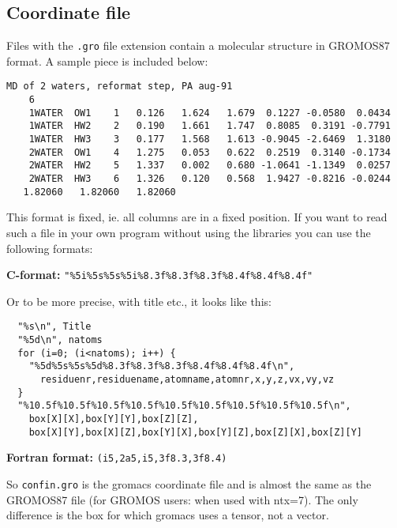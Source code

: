 \subsection{Coordinate file}
\label{subsec:grofile}
Files with the {\tt .gro} file extension contain a molecular structure in 
GROMOS87 format. A sample piece is included below:
{\small\begin{verbatim}
MD of 2 waters, reformat step, PA aug-91
    6
    1WATER  OW1    1   0.126   1.624   1.679  0.1227 -0.0580  0.0434
    1WATER  HW2    2   0.190   1.661   1.747  0.8085  0.3191 -0.7791
    1WATER  HW3    3   0.177   1.568   1.613 -0.9045 -2.6469  1.3180
    2WATER  OW1    4   1.275   0.053   0.622  0.2519  0.3140 -0.1734
    2WATER  HW2    5   1.337   0.002   0.680 -1.0641 -1.1349  0.0257
    2WATER  HW3    6   1.326   0.120   0.568  1.9427 -0.8216 -0.0244
   1.82060   1.82060   1.82060
\end{verbatim}}
This format is fixed, ie. all columns are in a fixed position. If you
want to read such a file in your own program without using the
{\gromacs} libraries you can use the following formats:

{\bf C-format:} \verb'"%5i%5s%5s%5i%8.3f%8.3f%8.3f%8.4f%8.4f%8.4f"'

Or to be more precise, with title etc., it looks like this:
\begin{verbatim}
  "%s\n", Title
  "%5d\n", natoms
  for (i=0; (i<natoms); i++) {
    "%5d%5s%5s%5d%8.3f%8.3f%8.3f%8.4f%8.4f%8.4f\n",
      residuenr,residuename,atomname,atomnr,x,y,z,vx,vy,vz
  }
  "%10.5f%10.5f%10.5f%10.5f%10.5f%10.5f%10.5f%10.5f%10.5f\n",
    box[X][X],box[Y][Y],box[Z][Z],
    box[X][Y],box[X][Z],box[Y][X],box[Y][Z],box[Z][X],box[Z][Y]
\end{verbatim}

{\bf Fortran format:} \verb'(i5,2a5,i5,3f8.3,3f8.4)'

So \verb'confin.gro' is the gromacs coordinate file and is almost the
same as the GROMOS87 file (for GROMOS users: when used with ntx=7). 
The only difference is the box for which gromacs uses a tensor, not a
vector.
